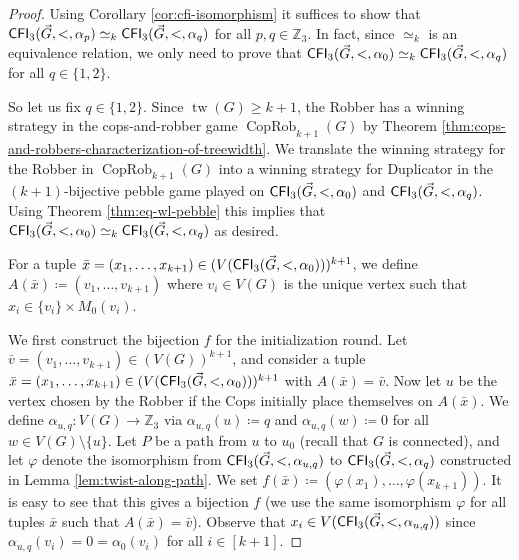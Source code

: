 \PassOptionsToPackage{dvipsnames,svgnames}{xcolor}\documentclass[10pt,a4paper]{article}
\newcommand{\ZZ}{{\mathbb Z}}
\DeclareMathOperator{\CopRob}{CopRob}
\DeclareMathOperator{\tw}{tw}
\newcommand{\CFI}{{\sf CFI}}
\begin{document}
\begin{proof}
 Using Corollary \ref{cor:cfi-isomorphism} it suffices to show that $\CFI_3(\vec{G},<,\alpha_p) \simeq_k \CFI_3(\vec{G},<,\alpha_q)$ for all $p,q \in \ZZ_3$.
 In fact, since $\simeq_k$ is an equivalence relation, we only need to prove that $\CFI_3(\vec{G},<,\alpha_0) \simeq_k \CFI_3(\vec{G},<,\alpha_q)$ for all $q \in \{1,2\}$.

 So let us fix $q \in \{1,2\}$.
 Since $\tw(G) \geq k+1$, the Robber has a winning strategy in the cops-and-robber game $\CopRob_{k+1}(G)$ by Theorem \ref{thm:cops-and-robbers-characterization-of-treewidth}.
 We translate the winning strategy for the Robber in $\CopRob_{k+1}(G)$ into a winning strategy for Duplicator in the $(k+1)$-bijective pebble game played on $\CFI_3(\vec{G},<,\alpha_0)$ and $\CFI_3(\vec{G},<,\alpha_q)$.
 Using Theorem \ref{thm:eq-wl-pebble} this implies that $\CFI_3(\vec{G},<,\alpha_0) \simeq_k \CFI_3(\vec{G},<,\alpha_q)$ as desired.

 For a tuple $\bar x = (x_1,\dots,x_{k+1}) \in (V(\CFI_3(\vec{G},<,\alpha_0)))^{k+1}$, we define $A(\bar x) \coloneqq (v_1,\dots,v_{k+1})$ where $v_i \in V(G)$ is the unique vertex such that $x_i \in \{v_i\} \times M_{0}(v_i)$.

 We first construct the bijection $f$ for the initialization round.
 Let $\bar v = (v_1,\dots,v_{k+1}) \in (V(G))^{k+1}$, and consider a tuple $\bar x = (x_1,\dots,x_{k+1}) \in (V(\CFI_3(\vec{G},<,\alpha_0)))^{k+1}$ with $A(\bar x) = \bar v$.
 Now let $u$ be the vertex chosen by the Robber if the Cops initially place themselves on $A(\bar x)$.
 We define $\alpha_{u,q}\colon V(G) \to \ZZ_3$ via $\alpha_{u,q}(u) \coloneqq q$ and $\alpha_{u,q}(w) \coloneqq 0$ for all $w \in V(G) \setminus \{u\}$.
 Let $P$ be a path from $u$ to $u_0$ (recall that $G$ is connected), and let $\varphi$ denote the isomorphism from $\CFI_3(\vec{G},<,\alpha_{u,q})$ to $\CFI_3(\vec{G},<,\alpha_{q})$ constructed in Lemma \ref{lem:twist-along-path}.
 We set $f(\bar x) \coloneqq (\varphi(x_1),\dots,\varphi(x_{k+1}))$.
 It is easy to see that this gives a bijection $f$ (we use the same isomorphism $\varphi$ for all tuples $\bar x$ such that $A(\bar x) = \bar v$).
 Observe that $x_i \in V(\CFI_3(\vec{G},<,\alpha_{u,q}))$ since $\alpha_{u,q}(v_i) = 0 = \alpha_0(v_i)$ for all $i \in [k+1]$.


\end{proof}
\end{document}
